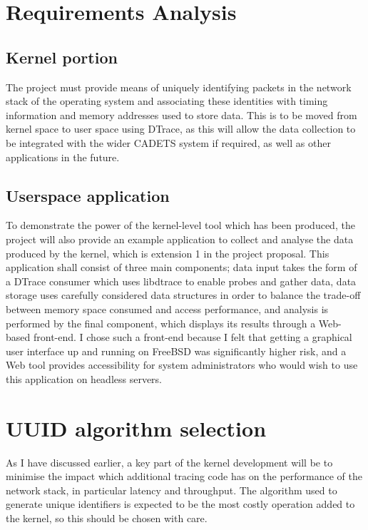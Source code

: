 \documentclass[a4paper,12pt,twoside,openright]{report}
\begin{document}
	\section{Requirements Analysis}
	
	\subsection{Kernel portion}
	
	The project must provide means of uniquely identifying packets in the network stack of the operating system and associating these identities with timing information and memory addresses used to store data. This is to be moved from kernel space to user space using DTrace, as this will allow the data collection to be integrated with the wider CADETS system if required, as well as other applications in the future.
	
	\subsection{Userspace application}
	
	To demonstrate the power of the kernel-level tool which has been produced, the project will also provide an example application to collect and analyse the data produced by the kernel, which is extension 1 in the project proposal. This application shall consist of three main components; data input takes the form of a DTrace consumer which uses libdtrace to enable probes and gather data, data storage uses carefully considered data structures in order to balance the trade-off between memory space consumed and access performance, and analysis is performed by the final component, which displays its results through a Web-based front-end. I chose such a front-end because I felt that getting a graphical user interface up and running on FreeBSD was significantly higher risk, and a Web tool provides accessibility for system administrators who would wish to use this application on headless servers.
	
	\section{UUID algorithm selection}
	
	As I have discussed earlier, a key part of the kernel development will be to minimise the impact which additional tracing code has on the performance of the network stack, in particular latency and throughput. The algorithm used to generate unique identifiers is expected to be the most costly operation added to the kernel, so this should be chosen with care.
	
\end{document}
